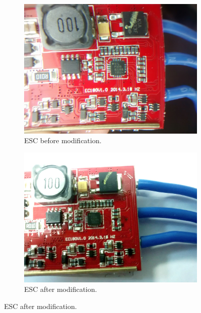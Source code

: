 \begin{figure}[H]
\centering
\begin{subfigure}{.5\textwidth}
  \centering
  \includegraphics[width=\linewidth]{figs/escbefore.jpg}
\caption{ESC before modification.}
\end{subfigure}%
\begin{subfigure}{.5\textwidth}
  \centering
  \includegraphics[width=\linewidth]{figs/escafter.jpg}
  \caption{ESC after modification.}
\end{subfigure}


\end{figure}
